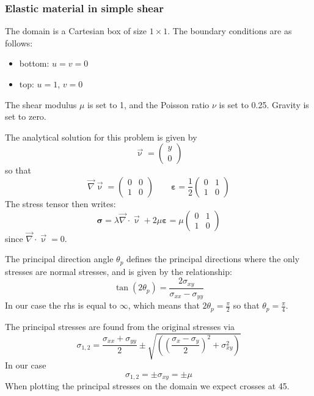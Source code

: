 \subsubsection{Elastic material in simple shear} \label{sec:elastsimpshear}

The domain is a Cartesian box of size $1\times1$. The boundary conditions are as follows:
\begin{itemize}
\item bottom: $u=v=0$
\item top: $u=1$, $v=0$
\end{itemize}
The shear modulus $\mu$ is set to 1, and the Poisson ratio $\nu$ is set to 0.25. 
Gravity is set to zero. 

The analytical solution for this problem is given by 
\[
\vec{\upnu}=
\left(
\begin{array}{c}
y \\
0 
\end{array}
\right)
\]
so that 
\[
\vec{\nabla}\vec{\upnu}=
\left(
\begin{array}{cc}
0 & 0 \\
1 & 0
\end{array}
\right)
\quad\quad
{\bm \varepsilon} = 
\frac{1}{2}
\left(
\begin{array}{cc}
0 & 1 \\
1 & 0
\end{array}
\right)
\]
The stress tensor then writes:
\[
{\bm \sigma}= \lambda \vec{\nabla}\cdot \vec{\upnu} + 2 \mu {\bm \varepsilon} 
= \mu 
\left(
\begin{array}{cc}
0 & 1 \\
1 & 0
\end{array}
\right)
\]
since $\vec{\nabla}\cdot \vec{\upnu}=0$.

The principal direction angle $\theta_p$ defines the principal
directions where the only stresses are normal stresses, and 
is given by the relationship:
\[
\tan (2\theta_p) =  \frac{2 \sigma_{xy}}{\sigma_{xx} -\sigma_{yy}}
\]
In our case the rhs is equal to $\infty$, which means that $2 \theta_p = \frac{\pi}{2}$
so that $\theta_p=\frac{\pi}{4}$.

The principal stresses are found from the original stresses via
\[
\sigma_{1,2}=\frac{\sigma_{xx}+\sigma_{yy}}{2} \pm \sqrt{  \left( \left(\frac{\sigma_x-\sigma_y}{2}\right)^2 +\sigma_{xy}^2  \right)}
\]
In our case 
\[
\sigma_{1,2} = \pm \sigma_{xy} = \pm \mu
\]
When plotting the principal stresses on the domain we expect crosses at 45\degree. 


